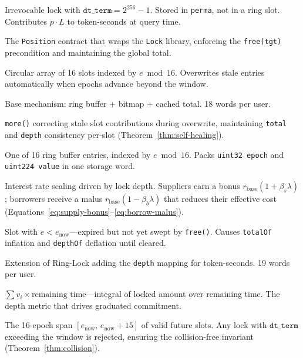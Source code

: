\documentclass[10pt,a4paper,twocolumn]{article}
\theoremstyle{definition}
\theoremstyle{plain}
\theoremstyle{remark}
\begin{document}
\begin{description}[style=nextline, font=\normalfont\bfseries, leftmargin=1.5em]
\item[Permanent Lock] Irrevocable lock with $\texttt{dt\_term} = 2^{256}{-}1$. Stored in \texttt{perma}, not in a ring slot. Contributes $p \cdot L$ to token-seconds at query time.

\item[Position Layer] The \texttt{Position} contract that wraps the \texttt{Lock} library, enforcing the \texttt{free(tgt)} precondition and maintaining the global total.

\item[Ring Buffer] Circular array of 16 slots indexed by $e \bmod 16$. Overwrites stale entries automatically when epochs advance beyond the window.

\item[Ring-Lock] Base mechanism: ring buffer + bitmap + cached total. 18 words per user.

\item[Self-Healing] \texttt{more()} correcting stale slot contributions during overwrite, maintaining \texttt{total} and \texttt{depth} consistency per-slot (Theorem~\ref{thm:self-healing}).

\item[Slot] One of 16 ring buffer entries, indexed by $e \bmod 16$. Packs \texttt{uint32 epoch} and \texttt{uint224 value} in one storage word.

\item[Lock Bonus/Malus] Interest rate scaling driven by lock depth. Suppliers earn a bonus $r_{\text{base}}(1 + \beta_s \lambda)$; borrowers receive a malus $r_{\text{base}}(1 - \beta_b \lambda)$ that reduces their effective cost (Equations~\ref{eq:supply-bonus}--\ref{eq:borrow-malus}).

\item[Stale Slot] Slot with $e < e_{\text{now}}$---expired but not yet swept by \texttt{free()}. Causes \texttt{totalOf} inflation and \texttt{depthOf} deflation until cleared.

\item[Time-Lock] Extension of Ring-Lock adding the \texttt{depth} mapping for token-seconds. 19 words per user.

\item[Token-Seconds] $\sum v_i \times \text{remaining time}$---integral of locked amount over remaining time. The depth metric that drives graduated commitment.

\item[Window] The 16-epoch span $[e_{\text{now}},\, e_{\text{now}}{+}15]$ of valid future slots. Any lock with $\texttt{dt\_term}$ exceeding the window is rejected, ensuring the collision-free invariant (Theorem~\ref{thm:collision}).

\end{description}

\clearpage
\ifodd\value{page}\else\thispagestyle{empty}\null\clearpage\fi
\end{document}

